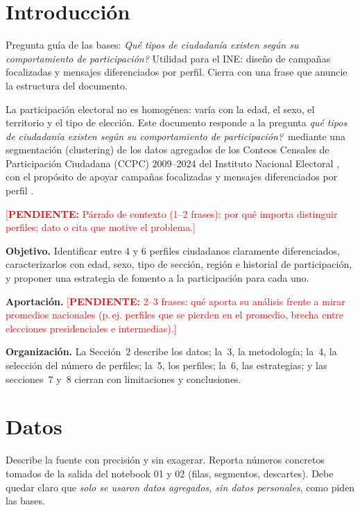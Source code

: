 \documentclass[11pt,letterpaper]{article}
\newcommand{\pend}[1]{\textcolor{red}{[\textbf{PENDIENTE:} #1]}}
\begin{document}
\section{Introducci\'on}
\begin{guia}
Pregunta gu\'ia de las bases: \emph{\textquestiondown Qu\'e tipos de ciudadan\'ia existen seg\'un su comportamiento de participaci\'on?} Utilidad para el INE: dise\~no de campa\~nas focalizadas y mensajes diferenciados por perfil. Cierra con una frase que anuncie la estructura del documento.
\end{guia}
La participaci\'on electoral no es homog\'enea: var\'ia con la edad, el sexo, el territorio y el tipo de elecci\'on. Este documento responde a la pregunta \emph{\textquestiondown qu\'e tipos de ciudadan\'ia existen seg\'un su comportamiento de participaci\'on?}\ mediante una segmentaci\'on (clustering) de los datos agregados de los Conteos Censales de Participaci\'on Ciudadana (CCPC) 2009--2024 del Instituto Nacional Electoral \cite{ine_ccpc}, con el prop\'osito de apoyar campa\~nas focalizadas y mensajes diferenciados por perfil \cite{ine_convocatoria}.

\pend{P\'arrafo de contexto (1--2 frases): por qu\'e importa distinguir perfiles; dato o cita que motive el problema.}

\textbf{Objetivo.} Identificar entre 4 y 6 perfiles ciudadanos claramente diferenciados, caracterizarlos con edad, sexo, tipo de secci\'on, regi\'on e historial de participaci\'on, y proponer una estrategia de fomento a la participaci\'on para cada uno.

\textbf{Aportaci\'on.} \pend{2--3 frases: qu\'e aporta su an\'alisis frente a mirar promedios nacionales (p.\,ej. perfiles que se pierden en el promedio, brecha entre elecciones presidenciales e intermedias).}

\textbf{Organizaci\'on.} La Secci\'on~2 describe los datos; la~3, la metodolog\'ia; la~4, la selecci\'on del n\'umero de perfiles; la~5, los perfiles; la~6, las estrategias; y las secciones~7 y~8 cierran con limitaciones y conclusiones.

\section{Datos}
\begin{guia}
Describe la fuente con precisi\'on y sin exagerar. Reporta n\'umeros concretos tomados de la salida del notebook 01 y 02 (filas, segmentos, descartes). Debe quedar claro que \emph{solo se usaron datos agregados, sin datos personales}, como piden las bases.
\end{guia}
\end{document}
